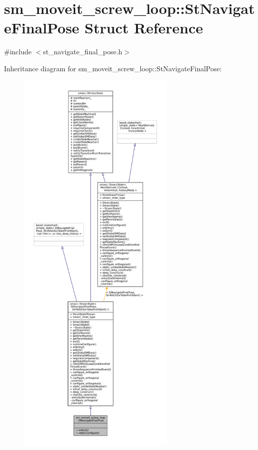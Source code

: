 \hypertarget{structsm__moveit__screw__loop_1_1StNavigateFinalPose}{}\section{sm\+\_\+moveit\+\_\+screw\+\_\+loop\+:\+:St\+Navigate\+Final\+Pose Struct Reference}
\label{structsm__moveit__screw__loop_1_1StNavigateFinalPose}


{\ttfamily \#include $<$st\+\_\+navigate\+\_\+final\+\_\+pose.\+h$>$}



Inheritance diagram for sm\+\_\+moveit\+\_\+screw\+\_\+loop\+:\+:St\+Navigate\+Final\+Pose\+:
\nopagebreak
\begin{figure}[H]
\begin{center}
\leavevmode
\includegraphics[height=550pt]{structsm__moveit__screw__loop_1_1StNavigateFinalPose__inherit__graph}
\end{center}
\end{figure}


